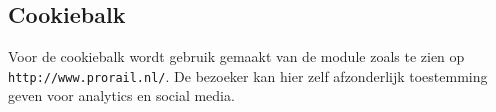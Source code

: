 \subsection{Cookiebalk}\label{cookiebalk}

Voor de cookiebalk wordt gebruik gemaakt van de  module zoals te zien op \texttt{http://www.prorail.nl/}. De bezoeker kan hier zelf afzonderlijk toestemming geven voor analytics en social media.


